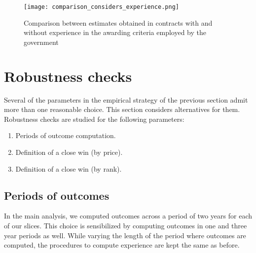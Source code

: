 \begin{figure}[H]
  \texttt{[image: comparison\_considers\_experience.png]}
  \caption{Comparison between estimates obtained in contracts with and without experience in the awarding criteria employed by the government}
  \label{fig:comparison_considers_experience}
\end{figure}




%


\section{Robustness checks}
\label{main_robustness}
Several of the parameters in the empirical strategy of the previous section admit more than one reasonable choice. This section considers alternatives for them. Robustness checks are studied for the following parameters:
\begin{enumerate}
  \item Periods of outcome computation.
  \item Definition of a close win (by price).
  \item Definition of a close win (by rank).
\end{enumerate}
\subsection{Periods of outcomes}
In the main analysis, we computed outcomes across a period of two years for each of our slices. This choice is sensibilized by computing outcomes in one and three year periods as well. While varying the length of the period where outcomes are computed, the procedures to compute experience are kept the same as before.

